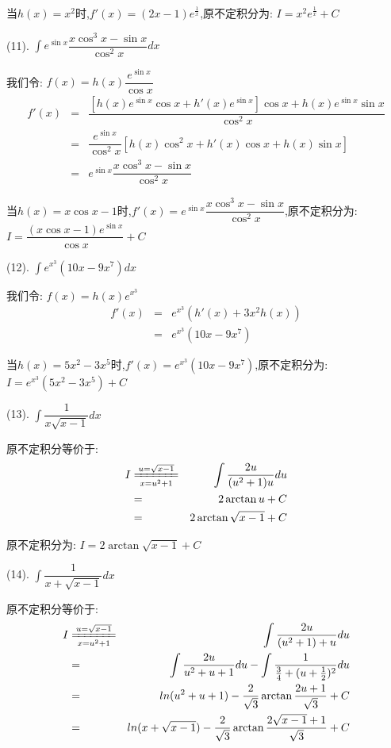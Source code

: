 \begin{anymark}[积分训练]
\begin{solution}
		当$h(x)=x^2$时,$f'(x)=(2x-1)e^{\frac{1}{x}}$,原不定积分为:  $I=x^2e^{\frac{1}{x}}+C$
	\end{solution}
	(11). $\int e^{\sin x}\dfrac{x\cos^3 x-\sin x}{\cos^2x}dx$
	\begin{solution}
		
		我们令:  $f(x)=h(x)\dfrac{e^{\sin x}}{\cos x}$
		\begin{eqnarray*}
			f'(x)&=&\dfrac{\left[h(x)e^{\sin x}\cos x+h'(x)e^{\sin x}\right]\cos x+h(x)e^{\sin x}\sin x }{\cos^2 x}\\
			&=&\dfrac{e^{\sin x}}{\cos^2 x}\left[ h(x)\cos^2 x+h'(x)\cos x+h(x)\sin x\right] \\
			&=&e^{\sin x}\dfrac{x\cos^3 x-\sin x}{\cos^2x}
		\end{eqnarray*}
		
		当$h(x)=x\cos x-1$时,$f'(x)=e^{\sin x}\dfrac{x\cos^3 x-\sin x}{\cos^2x}$,原不定积分为:  $I=\dfrac{(x\cos x-1)e^{\sin x}}{\cos x}+C$
	\end{solution}
	(12). $\int e^{x^3}(10x-9x^7)dx$
	\begin{solution}
		
		我们令:  $f(x)=h(x)e^{x^3}$
		\begin{eqnarray*}
			f'(x)&=&e^{x^3}\left(h'(x)+3x^2h(x)\right) \\
			&=&e^{x^3}(10x-9x^7)
		\end{eqnarray*}
		
		当$h(x)=5x^2-3x^5$时,$f'(x)=e^{x^3}(10x-9x^7)$,原不定积分为:  $I=e^{x^3}(5x^2-3x^5)+C$
	\end{solution}
	(13). $\int \dfrac{1}{x\sqrt{x-1}}dx$
	\begin{solution}
		
		原不定积分等价于:  
		\begin{eqnarray*}
			I&\xlongequal[x=u^2+1]{u=\sqrt{x-1}}&\int \dfrac{2u}{(u^2+1)u}du\\
			&=&2\arctan u+C\\
			&=&2\arctan \sqrt{x-1}+C
		\end{eqnarray*}
	
	原不定积分为:  $I=2\arctan \sqrt{x-1}+C$
	\end{solution}
	(14). $\int \dfrac{1}{x+\sqrt{x-1}}dx$
	\begin{solution}
		
		原不定积分等价于:  
		\begin{eqnarray*}
			I&\xlongequal[x=u^2+1]{u=\sqrt{x-1}}&\int \dfrac{2u}{(u^2+1)+u}du\\
			&=&\int \dfrac{2u}{u^2+u+1}du-\int \dfrac{1}{\frac{3}{4}+(u+\frac{1}{2})^2}du\\
			&=&ln(u^2+u+1)-\frac{2}{\sqrt{3}}\arctan\dfrac{2u+1}{\sqrt{3}}+C\\
			&=&ln(x+\sqrt{x-1})-\dfrac{2}{\sqrt{3}}\arctan\dfrac{2\sqrt{x-1}+1}{\sqrt{3}}+C
		\end{eqnarray*}
		

\end{solution}
\end{anymark}
